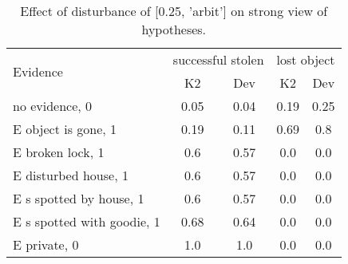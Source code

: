 \begin{table}\begin{tabular}{l|cc|cc}\toprule\multirow{2}{*}{Evidence} & \multicolumn{2}{c}{successful stolen}& \multicolumn{2}{c}{lost object}\\& {K2} & {Dev}& {K2} & {Dev}\\\midrule
no evidence, 0 & 0.05&0.04&\cellcolor{Bittersweet}0.19&\cellcolor{Bittersweet}0.25\\E object is gone, 1 & \cellcolor{Bittersweet}0.19&\cellcolor{Bittersweet}0.11&\cellcolor{Bittersweet}0.69&\cellcolor{Bittersweet}0.8\\E broken lock, 1 & 0.6&0.57&0.0&0.0\\E disturbed house, 1 & 0.6&0.57&0.0&0.0\\E s spotted by house, 1 & 0.6&0.57&0.0&0.0\\E s spotted with goodie, 1 & 0.68&0.64&0.0&0.0\\E private, 0 & 1.0&1.0&0.0&0.0\\\bottomrule\end{tabular}\caption{Effect of disturbance of [0.25, 'arbit'] on strong view of hypotheses.}\end{table}